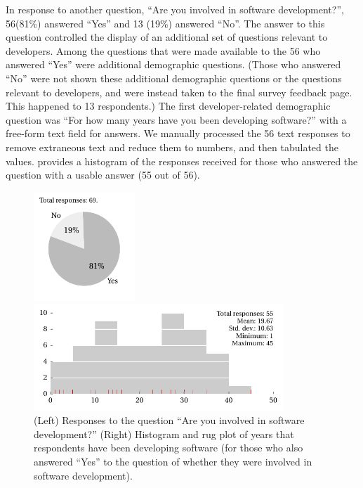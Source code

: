 \documentclass{casicswhitepaper}
\newcommand{\totaldevelopers}{56\xspace}
\begin{document}
In response to another question, ``Are you involved in software development?'', \totaldevelopers (81\%) answered ``Yes'' and 13 (19\%) answered ``No''.  The answer to this question controlled the display of an additional set of questions relevant to developers.  Among the questions that were made available to the \totaldevelopers who answered ``Yes'' were additional demographic questions.  (Those who answered ``No'' were not shown these additional demographic questions or the questions relevant to developers, and were instead taken to the final survey feedback page.  This happened to 13 respondents.)  The first developer-related demographic question was ``For how many years have you been developing software?'' with a free-form text field for answers.  We manually processed the \totaldevelopers text responses to remove extraneous text and reduce them to numbers, and then tabulated the values.   provides a histogram of the responses received for those who answered the question with a usable answer (55 out of \totaldevelopers).


\begin{figure}[thb]
  \vspace*{1ex}
  \hspace*{0.25in}
  \begin{minipage}[b]{0.3\linewidth}
    \includegraphics[width=1.5in]{files/plots/number-of-developers.pdf}
  \end{minipage}%
  \begin{minipage}[b]{0.75\linewidth}
    \includegraphics[width=3.7in]{files/plots/histogram-years.pdf}
  \end{minipage}%
  \vspace*{-2ex}
  \caption{(Left) Responses to the question  ``Are you involved in software development?'' (Right) Histogram and rug plot of years that respondents have been developing software (for those who also answered ``Yes'' to the question of whether they were involved in software development).}
  \label{years}
\end{figure}
\end{document}

